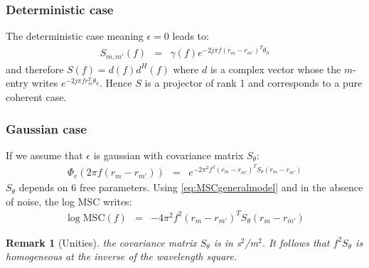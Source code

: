 \documentclass[a4paper, 12pt]{report}
\newtheorem{remark}{Remark}
\def\MSC{\mathrm{MSC}}
\begin{document}
\subsubsection{Deterministic case}
The deterministic case meaning $\epsilon=0$ leads to:
\begin{eqnarray*}
S_{m,m'}(f) &=& \gamma(f)e^{-2j\pi f (r_{m}-r_{m'})^T\theta_0}
\end{eqnarray*}
and therefore $S(f)=d(f)d^H(f)$ where $d$ is a complex vector whose the $m$-entry writes $e^{-2j\pi f r_{m}^T\theta_0}$. Hence $S$ is a projector of rank 1 and corresponds to a pure coherent case.

\subsubsection{Gaussian case}
If we assume that $\epsilon$ is gaussian with covariance matrix $S_{\theta}$:
\begin{eqnarray*}
 \Phi_{e}(2\pi f(r_{m}-r_{m'}))&=& e^{-2\pi^2f^2 (r_{m}-r_{m'})^TS_{\theta}(r_{m}-r_{m'})}
\end{eqnarray*}
$S_{\theta}$ depends on 6 free parameters. Using \eqref{eq:MSCgeneralmodel} and in the absence of noise, the log MSC writes:
\begin{eqnarray}
\label{eq:MSCgaussianwithoutnoise}
 \log \MSC(f) &=& -4\pi^2f^2 (r_{m}-r_{m'})^TS_{\theta}(r_{m}-r_{m'})
\end{eqnarray}

\begin{remark}[Unities]
the covariance matrix $S_{\theta}$ is in s$^2$/m$^2$. It follows that $f^2 S_{\theta}$ is homogeneous at the inverse of the wavelength square.
\end{remark}


\end{document}
